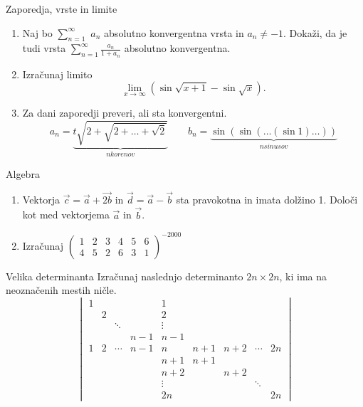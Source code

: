 \begin{frame}{Zaporedja, vrste in limite}
	\begin{enumerate}
		\item 
		Naj bo $\sum_{n=1}^{\infty}$ $a_n$ absolutno konvergentna vrsta in $a_n \ne -1$.
		Dokaži, da je tudi vrsta $\sum_{n=1}^\infty \frac{a_n}{1+a_n}$
		absolutno konvergentna.

		\item
		Izračunaj limito
		$$ \lim_{x\to\infty } (\sin\sqrt{x+1} -\sin\sqrt{x}). $$

		\item
		Za dani zaporedji preveri, ali sta konvergentni.
		$$
		 a_n = \underbrace{t\sqrt{2+\sqrt{2+\dots+\sqrt{2}}}}_{n korenov} \qquad
		 b_n = \underbrace{\sin(\sin(\dots(\sin 1)\dots))}_{n sinusov}
		$$
		
	\end{enumerate}
\end{frame}

\begin{frame}{Algebra}
	\begin{enumerate}
		\item
		Vektorja $\vec{c}= \vec{a} + \vec{2b}$ in $\vec{d}= \vec{a}-\vec{b}$
		sta pravokotna in imata dolžino 1. Določi kot med vektorjema $\vec{a}$ in $\vec{b}$.
		\item 
		Izračunaj $
		{\begin{pmatrix}
			1 & 2 & 3 & 4 & 5 & 6\\
            4 & 5 & 2 & 6 & 3 & 1
		\end{pmatrix}}^{-2000} $
		
	\end{enumerate}
\end{frame}

\begin{frame}{Velika determinanta}     %
	Izračunaj naslednjo determinanto $2n \times 2n$, ki ima na neoznačenih mestih ničle.
	$$\begin{vmatrix}
		1 &  & & & 1& & & & \\
		&  2 & & & 2 & & & &    \\
		&  & \ddots & & \vdots & & & &     \\
		& &  & n-1 & n-1 & & & &     \\
		1 & 2 & \cdots & n-1& n & n+1& n+2& \cdots   & 2n      \\
		& & &  & n+1 & n+1 & & &     \\
		& &  & & n+2 & & n+2 & &     \\
		& & &  & \vdots& & & \ddots &     \\
		& &  & & 2n & & & & 2n     
    \end{vmatrix}$$
\end{frame}

